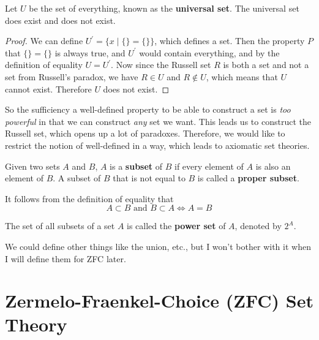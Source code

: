 \documentclass{article}
\begin{document}
    \begin{theorem}
      Let $U$ be the set of everything, known as the \textbf{universal set}. The universal set does exist and does not exist. 
    \end{theorem}
    \begin{proof}
      We can define $U^\prime = \{x \mid \{\} = \{\} \}$, which defines a set. Then the property $P$ that $\{\} = \{\}$ is always true, and $U^\prime$ would contain everything, and by the definition of equality $U = U^\prime$. Now since the Russell set $R$ is both a set and not a set from Russell's paradox, we have $R \in U$ and $R \not\in U$, which means that $U$ cannot exist. Therefore $U$ does not exist. 
    \end{proof}

    So the sufficiency a well-defined property to be able to construct a set is \textit{too powerful} in that we can construct \textit{any} set we want. This leads us to construct the Russell set, which opens up a lot of paradoxes. Therefore, we would like to restrict the notion of well-defined in a way, which leads to axiomatic set theories. 

    \begin{definition}[Subsets]
      Given two sets $A$ and $B$, $A$ is a \textbf{subset} of $B$ if every element of $A$ is also an element of $B$. A subset of $B$ that is not equal to $B$ is called a \textbf{proper subset}. 
    \end{definition}

    \begin{theorem}[Equality]
      It follows from the definition of equality that 
      \begin{equation}
        A \subset B \text{ and } B \subset A \iff A = B
      \end{equation}
    \end{theorem}

    \begin{definition}
      The set of all subsets of a set $A$ is called the \textbf{power set} of $A$, denoted by $2^A$. 
    \end{definition}

    We could define other things like the union, etc., but I won't bother with it when I will define them for ZFC later.  

\section{Zermelo-Fraenkel-Choice (ZFC) Set Theory} 
\end{document}
